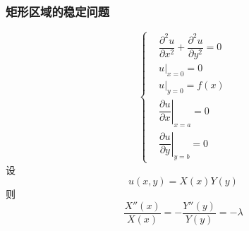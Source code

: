 \documentclass{article}
\begin{document}
\subsubsection{矩形区域的稳定问题}

\begin{equation*}
  \left\{
  \begin{aligned}
    & \dfrac{\partial^{2} u}{\partial x^{2}} + \dfrac{\partial^{2} u}{\partial y^{2}} = 0\\
    & u|_{x=0} = 0\\
    & u|_{y=0} = f(x)\\
    & \!\!\left. \dfrac{\partial u}{\partial x} \right|_{x=a} = 0\\
    & \!\!\left. \dfrac{\partial u }{\partial y} \right|_{y=b} = 0
  \end{aligned}
  \right.
\end{equation*}
设
\begin{equation*}
  u \left( x,y \right) = X(x)Y(y)
\end{equation*}
则
\begin{equation*}
  \dfrac{X''(x)}{X(x)} = - \dfrac{Y''(y)}{Y(y)} = - \lambda 
\end{equation*}
\end{document}
